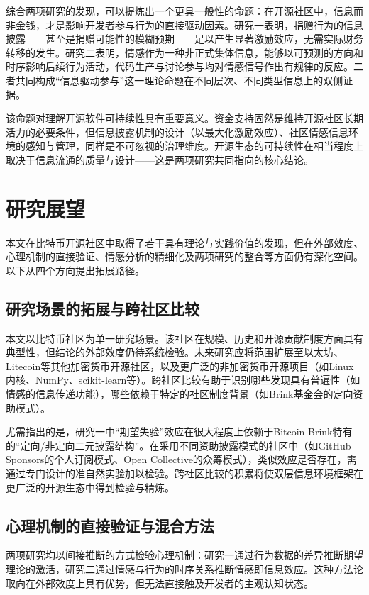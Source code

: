 综合两项研究的发现，可以提炼出一个更具一般性的命题：在开源社区中，信息而非金钱，才是影响开发者参与行为的直接驱动因素。研究一表明，捐赠行为的信息披露——甚至是捐赠可能性的模糊预期——足以产生显著激励效应，无需实际财务转移的发生。研究二表明，情感作为一种非正式集体信息，能够以可预测的方向和时序影响后续行为活动，代码生产与讨论参与均对情感信号作出有规律的反应。二者共同构成“信息驱动参与”这一理论命题在不同层次、不同类型信息上的双侧证据。

该命题对理解开源软件可持续性具有重要意义。资金支持固然是维持开源社区长期活力的必要条件，但信息披露机制的设计（以最大化激励效应）、社区情感信息环境的感知与管理，同样是不可忽视的治理维度。开源生态的可持续性在相当程度上取决于信息流通的质量与设计——这是两项研究共同指向的核心结论。

\section{研究展望}

本文在比特币开源社区中取得了若干具有理论与实践价值的发现，但在外部效度、心理机制的直接验证、情感分析的精细化及两项研究的整合等方面仍有深化空间。以下从四个方向提出拓展路径。

\subsection{研究场景的拓展与跨社区比较}

本文以比特币社区为单一研究场景。该社区在规模、历史和开源贡献制度方面具有典型性，但结论的外部效度仍待系统检验。未来研究应将范围扩展至以太坊、Litecoin等其他加密货币开源社区，以及更广泛的非加密货币开源项目（如Linux内核、NumPy、scikit-learn等）。跨社区比较有助于识别哪些发现具有普遍性（如情感的信息传递功能），哪些依赖于特定的社区制度背景（如Brink基金会的定向资助模式）。

尤需指出的是，研究一中“期望失验”效应在很大程度上依赖于Bitcoin Brink特有的“定向/非定向二元披露结构”。在采用不同资助披露模式的社区中（如GitHub Sponsors的个人订阅模式、Open Collective的众筹模式），类似效应是否存在，需通过专门设计的准自然实验加以检验。跨社区比较的积累将使双层信息环境框架在更广泛的开源生态中得到检验与精炼。

\subsection{心理机制的直接验证与混合方法}

两项研究均以间接推断的方式检验心理机制：研究一通过行为数据的差异推断期望理论的激活，研究二通过情感与行为的时序关系推断情感即信息效应。这种方法论取向在外部效度上具有优势，但无法直接触及开发者的主观认知状态。

